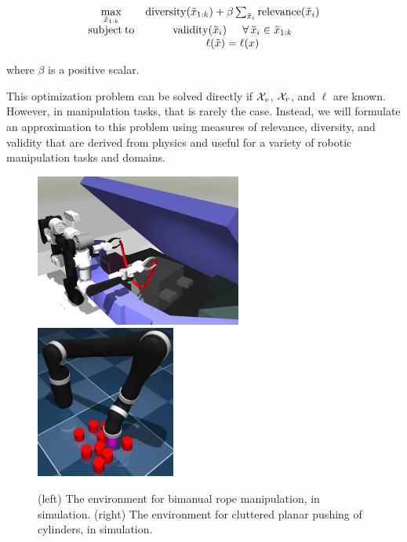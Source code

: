 \begin{equation}
    \label{RSS:eq:most_general}
    \begin{array}{cc}
        \underset{\Tilde{x}_{1:k}}{\mathrm{max}} & \mathrm{diversity}(\Tilde{x}_{1:k}) + \beta \sum_{\Tilde{x}_i}\mathrm{relevance}(\Tilde{x}_i) \\
        \mathrm{subject\: to} & \mathrm{validity}(\Tilde{x}_i)\:\:\quad \forall\,\Tilde{x}_i \in \Tilde{x}_{1:k}\\
        & \ell(\Tilde{x})=\ell(x) \\
    \end{array}
\end{equation}

\noindent where $\beta$ is a positive scalar.

This optimization problem can be solved directly if $\mathcal{X}_v$, $\mathcal{X}_r$, and $\ell$ are known. However, in manipulation tasks, that is rarely the case. Instead, we will formulate an approximation to this problem using measures of relevance, diversity, and validity that are derived from physics and useful for a variety of robotic manipulation tasks and domains.

\begin{figure}
    \centering
    \includegraphics[height=5cm]{Chap3/images/car_sim_env-cropped.png}
    \includegraphics[height=5cm]{Chap3/images/cylinders_env.png}
    \caption{(left) The environment for bimanual rope manipulation, in simulation. (right) The environment for cluttered planar pushing of cylinders, in simulation.}
    \label{RSS:fig:sim_envs}
\end{figure}

